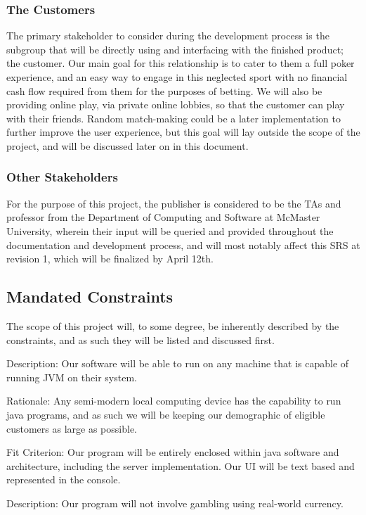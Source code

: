 \documentclass[12pt, titlepage]{article}
\begin{document}
\subsubsection{The Customers}
The primary stakeholder to consider during the development process is the subgroup that will be directly using and interfacing with the finished product; the customer. Our main goal for this relationship is to cater to them a full poker experience, and an easy way to engage in this neglected sport with no financial cash flow required from them for the purposes of betting. We will also be providing online play, via private online lobbies, so that the customer can play with their friends. Random match-making could be a later implementation to further improve the user experience, but this goal will lay outside the scope of the project, and will be discussed later on in this document.
\subsubsection{Other Stakeholders}
For the purpose of this project, the publisher is considered to be the TAs and professor from the Department of Computing and Software at McMaster University, wherein their input will be queried and provided throughout the documentation and development process, and will most notably affect this SRS at revision 1, which will be finalized by April 12th. 
\subsection{Mandated Constraints}
The scope of this project will, to some degree, be inherently described by the constraints, and as such they will be listed and discussed first. 

\bigskip

Description: Our software will be able to run on any machine that is capable of running JVM on their system.

Rationale: Any semi-modern local computing device has the capability to run java programs, and as such we will be keeping our demographic of eligible customers as large as possible.

Fit Criterion: Our program will be entirely enclosed within java software and architecture, including the server implementation. Our UI will be text based and represented in the console. 

\bigskip

Description: Our program will not involve gambling using real-world currency.
\end{document}
